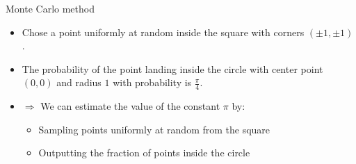 \documentclass{beamer}
\renewcommand{\>}{\rangle}
\newcommand{\<}{\langle}
\begin{document}
%

\begin{frame}{Monte Carlo method}
    \begin{itemize}
        \item Chose a point uniformly at random inside the square with corners $(\pm 1, \pm 1)$.
        
        \medskip
        \item The probability of the point landing inside the circle with center point $(0,0)$ and radius $1$ with probability is $\frac{\pi}{4}$.
        
        \bigskip
        \quad\quad{}

        \medskip
        \item $\Longrightarrow$ We can estimate the value of the constant $\pi$ by:
        
        \medskip
        \begin{itemize}
            \item Sampling points uniformly at random from the square
            
            \medskip
            \item Outputting the fraction of points inside the circle
        \end{itemize}
    \end{itemize}
\end{frame}

%
\end{document}
